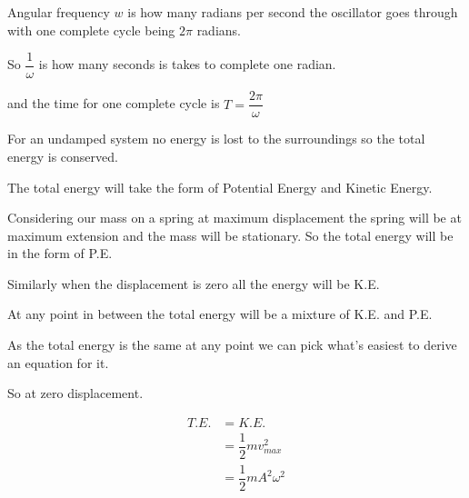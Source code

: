 \documentclass[main.tex]{subfiles}
\begin{document}

Angular frequency $w$ is how many radians per second the oscillator goes through with one complete cycle being $2 \pi$ radians.

So $\dfrac{1}{\omega}$ is how many seconds is takes to complete one radian.

and the time for one complete cycle is $T = \dfrac{2 \pi}{\omega}$



For an undamped system no energy is lost to the surroundings so the total energy is conserved.

The total energy will take the form of Potential Energy  and Kinetic Energy.

Considering our mass on a spring at maximum displacement the spring will be at maximum extension and the mass will be stationary. So the total energy will be in the form of P.E.

Similarly when the displacement is zero all the energy will be K.E.

At any point in between the total energy will be a mixture of K.E. and P.E. 

As the total energy is the same at any point we can pick what's easiest to derive an equation for it.

So at zero displacement.




\begin{align*} 
T.E. &= K.E. \\
&= \dfrac{1}{2}mv_{max}^2 \\
&= \dfrac{1}{2}mA^2\omega^2 \\
\end{align*}

\end{document}
